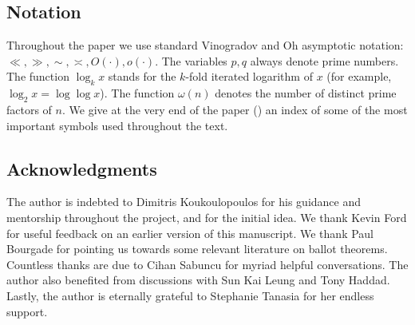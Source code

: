 \documentclass{amsart}
\theoremstyle{definition}
\numberwithin{equation}{section}
\begin{document}
	
	\subsection*{Notation} Throughout the paper we use standard Vinogradov and Oh asymptotic notation: $\ll,\gg,\sim,\asymp,O(\cdot),o(\cdot)$. The variables $p,q$ always denote prime numbers. The function $\log_kx$ stands for the $k$-fold iterated logarithm of $x$ (for example, $\log_2 x = \log \log x$). The function $\omega(n)$ denotes the number of distinct prime factors of $n$. We give at the very end of the paper () an index of some of the most important symbols used throughout the text.
	
	\subsection*{Acknowledgments}
	The author is indebted to Dimitris Koukoulopoulos for his guidance and mentorship throughout the project, and for the initial idea. We thank Kevin Ford for useful feedback on an earlier version of this manuscript. We thank Paul Bourgade for pointing us towards some relevant literature on ballot theorems. Countless thanks are due to Cihan Sabuncu for myriad helpful conversations. The author also benefited from discussions with Sun Kai Leung and Tony Haddad. Lastly, the author is eternally grateful to Stephanie Tanasia for her endless support.
	
\end{document}
